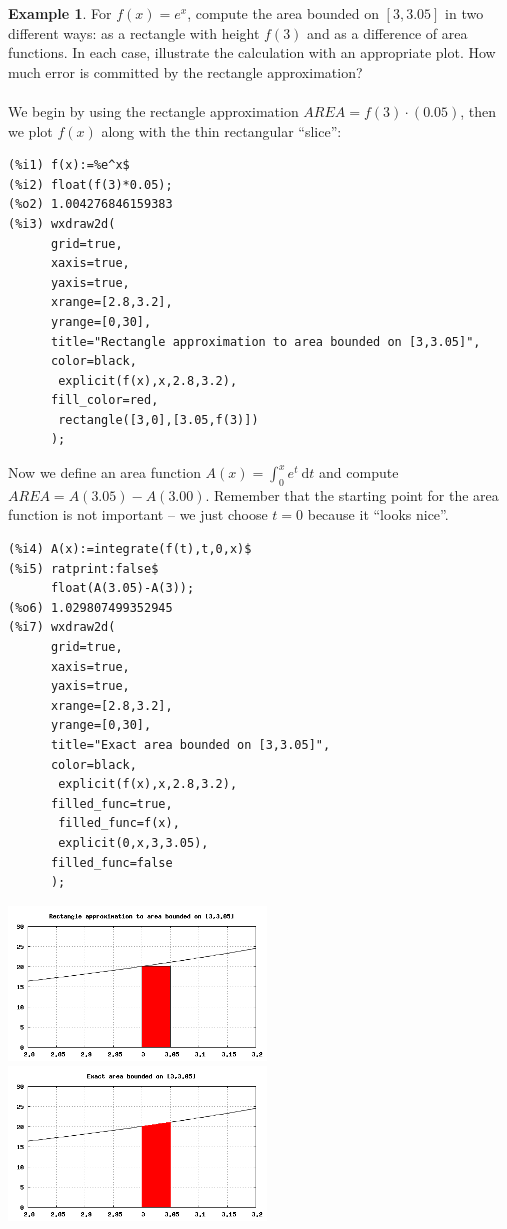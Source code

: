 \documentclass[10.5pt,twoside]{report}
\theoremstyle{definition}
\newtheorem{exmp}{Example}[section]
\begin{document}
\begin{exmp} For $f(x)=e^x$, compute the area bounded on $[3,3.05]$ in two different ways:  as a rectangle with height $f(3)$ and as a difference of area functions.  In each case, illustrate the calculation with an appropriate plot.  How much error is committed by the rectangle approximation?\\
${}$\\

We begin by using the rectangle approximation $AREA=f(3)\cdot (0.05)$, then we plot $f(x)$ along with the thin rectangular ``slice'':

\begin{verbatim}
(%i1) f(x):=%e^x$
(%i2) float(f(3)*0.05);
(%o2) 1.004276846159383
(%i3) wxdraw2d(
      grid=true,
      xaxis=true,
      yaxis=true,
      xrange=[2.8,3.2],
      yrange=[0,30],
      title="Rectangle approximation to area bounded on [3,3.05]",
      color=black,
       explicit(f(x),x,2.8,3.2),
      fill_color=red,
       rectangle([3,0],[3.05,f(3)])
      );
\end{verbatim}



Now we define an area function $A(x)=\displaystyle \int_{0}^{x} e^t \ \mathrm{d}t$ and compute $AREA=A(3.05)-A(3.00)$.  Remember that the starting point for the area function is not important -- we just choose $t=0$ because it ``looks nice''.

\begin{verbatim}
(%i4) A(x):=integrate(f(t),t,0,x)$
(%i5) ratprint:false$
      float(A(3.05)-A(3));
(%o6) 1.029807499352945
(%i7) wxdraw2d(
      grid=true,
      xaxis=true,
      yaxis=true,
      xrange=[2.8,3.2],
      yrange=[0,30],
      title="Exact area bounded on [3,3.05]",
      color=black,
       explicit(f(x),x,2.8,3.2),
      filled_func=true,
       filled_func=f(x),
       explicit(0,x,3,3.05),
      filled_func=false
      );
\end{verbatim}


\includegraphics[width=2.7in]{example_7_2_1_1}
\includegraphics[width=2.7in]{example_7_2_1_2}


\end{exmp}
\end{document}
